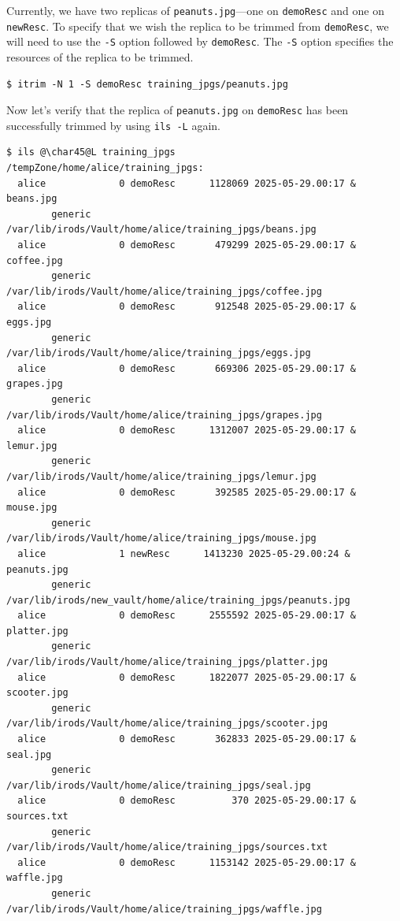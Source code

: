 \documentclass[10pt,oneside]{memoir}
\begin{document}
Currently, we have two replicas of \texttt{peanuts.jpg}---one on \texttt{demoResc} and one on \texttt{newResc}. To specify that we wish the replica to be trimmed from \texttt{demoResc}, we will need to use the \texttt{-S} option followed by \texttt{demoResc}. The \texttt{-S} option specifies the resources of the replica to be trimmed.

\begin{lstlisting}
$ itrim -N 1 -S demoResc training_jpgs/peanuts.jpg
\end{lstlisting}

Now let's verify that the replica of \texttt{peanuts.jpg} on \texttt{demoResc} has been successfully trimmed by using \texttt{ils -L} again.

\begin{lstlisting}[basicstyle=\tiny\ttfamily]
$ ils @\char45@L training_jpgs
/tempZone/home/alice/training_jpgs:
  alice             0 demoResc      1128069 2025-05-29.00:17 & beans.jpg
        generic    /var/lib/irods/Vault/home/alice/training_jpgs/beans.jpg
  alice             0 demoResc       479299 2025-05-29.00:17 & coffee.jpg
        generic    /var/lib/irods/Vault/home/alice/training_jpgs/coffee.jpg
  alice             0 demoResc       912548 2025-05-29.00:17 & eggs.jpg
        generic    /var/lib/irods/Vault/home/alice/training_jpgs/eggs.jpg
  alice             0 demoResc       669306 2025-05-29.00:17 & grapes.jpg
        generic    /var/lib/irods/Vault/home/alice/training_jpgs/grapes.jpg
  alice             0 demoResc      1312007 2025-05-29.00:17 & lemur.jpg
        generic    /var/lib/irods/Vault/home/alice/training_jpgs/lemur.jpg
  alice             0 demoResc       392585 2025-05-29.00:17 & mouse.jpg
        generic    /var/lib/irods/Vault/home/alice/training_jpgs/mouse.jpg
  alice             1 newResc      1413230 2025-05-29.00:24 & peanuts.jpg
        generic    /var/lib/irods/new_vault/home/alice/training_jpgs/peanuts.jpg
  alice             0 demoResc      2555592 2025-05-29.00:17 & platter.jpg
        generic    /var/lib/irods/Vault/home/alice/training_jpgs/platter.jpg
  alice             0 demoResc      1822077 2025-05-29.00:17 & scooter.jpg
        generic    /var/lib/irods/Vault/home/alice/training_jpgs/scooter.jpg
  alice             0 demoResc       362833 2025-05-29.00:17 & seal.jpg
        generic    /var/lib/irods/Vault/home/alice/training_jpgs/seal.jpg
  alice             0 demoResc          370 2025-05-29.00:17 & sources.txt
        generic    /var/lib/irods/Vault/home/alice/training_jpgs/sources.txt
  alice             0 demoResc      1153142 2025-05-29.00:17 & waffle.jpg
        generic    /var/lib/irods/Vault/home/alice/training_jpgs/waffle.jpg
\end{lstlisting}
\end{document}
